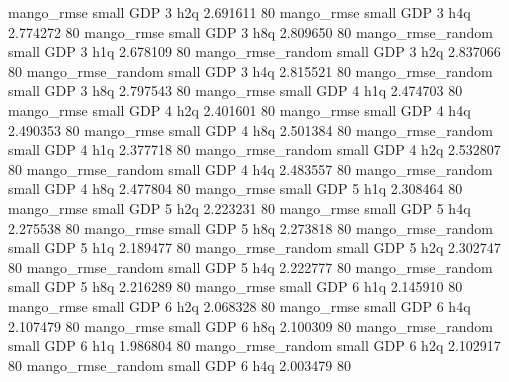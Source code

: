        mango_rmse      small      GDP                 3                  h2q 2.691611 80
       mango_rmse      small      GDP                 3                  h4q 2.774272 80
       mango_rmse      small      GDP                 3                  h8q 2.809650 80
mango_rmse_random      small      GDP                 3                  h1q 2.678109 80
mango_rmse_random      small      GDP                 3                  h2q 2.837066 80
mango_rmse_random      small      GDP                 3                  h4q 2.815521 80
mango_rmse_random      small      GDP                 3                  h8q 2.797543 80
       mango_rmse      small      GDP                 4                  h1q 2.474703 80
       mango_rmse      small      GDP                 4                  h2q 2.401601 80
       mango_rmse      small      GDP                 4                  h4q 2.490353 80
       mango_rmse      small      GDP                 4                  h8q 2.501384 80
mango_rmse_random      small      GDP                 4                  h1q 2.377718 80
mango_rmse_random      small      GDP                 4                  h2q 2.532807 80
mango_rmse_random      small      GDP                 4                  h4q 2.483557 80
mango_rmse_random      small      GDP                 4                  h8q 2.477804 80
       mango_rmse      small      GDP                 5                  h1q 2.308464 80
       mango_rmse      small      GDP                 5                  h2q 2.223231 80
       mango_rmse      small      GDP                 5                  h4q 2.275538 80
       mango_rmse      small      GDP                 5                  h8q 2.273818 80
mango_rmse_random      small      GDP                 5                  h1q 2.189477 80
mango_rmse_random      small      GDP                 5                  h2q 2.302747 80
mango_rmse_random      small      GDP                 5                  h4q 2.222777 80
mango_rmse_random      small      GDP                 5                  h8q 2.216289 80
       mango_rmse      small      GDP                 6                  h1q 2.145910 80
       mango_rmse      small      GDP                 6                  h2q 2.068328 80
       mango_rmse      small      GDP                 6                  h4q 2.107479 80
       mango_rmse      small      GDP                 6                  h8q 2.100309 80
mango_rmse_random      small      GDP                 6                  h1q 1.986804 80
mango_rmse_random      small      GDP                 6                  h2q 2.102917 80
mango_rmse_random      small      GDP                 6                  h4q 2.003479 80
